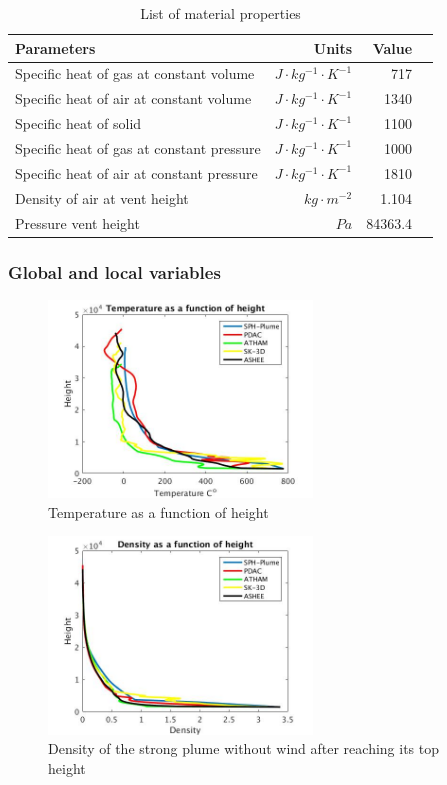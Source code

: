\documentclass[journal abbreviation, manuscript]{copernicus}
\begin{document}
\begin{table}[htp]
	\begin{centering}
      \caption{List of material properties}		
	  \begin{tabular}{lrrr}
	    \hline
	    Parameters & Units  & Value \\
	    \hline
	    	Specific heat of gas at constant volume     & $J \cdot kg^{-1}\cdot K^{-1}$& 717     \\
	    Specific heat of air at constant volume     & $J \cdot kg^{-1}\cdot K^{-1}$& 1340    \\
	    	Specific heat of solid                      & $J \cdot kg^{-1}\cdot K^{-1}$& 1100    \\
	    	Specific heat of gas at constant pressure   & $J \cdot kg^{-1}\cdot K^{-1}$& 1000    \\
	    	Specific heat of air at constant pressure   & $J \cdot kg^{-1}\cdot K^{-1}$& 1810    \\
	    	Density of air at vent height               & $kg \cdot m^{-2}$       & 1.104   \\
	    Pressure vent height                        & $Pa$              & 84363.4 \\
	    \hline
	  \end{tabular}
	  \label{tab:material_properties}
	\end{centering}
\end{table}

\subsubsection{Global and local variables}

\begin{figure}
\center
\includegraphics[width=7cm]{Temp}
\caption{Temperature as a function of height}
\label{fig:strong_local_temp}
\end{figure}
\begin{figure}
\center
\includegraphics[width=7cm]{density_strong}
\caption{Density of the strong plume without wind after reaching its top height}
\label{fig:strong_local_density}
\end{figure}
\end{document}
